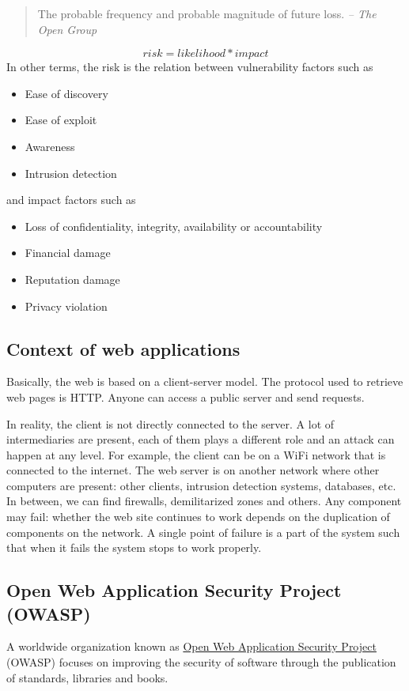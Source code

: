\begin{quote}
The probable frequency and probable magnitude of future loss.
\textit{-- The Open Group}
\end{quote}
\[
   risk = likelihood * impact
\]
In other terms, the risk is the relation between vulnerability factors such as
\begin{itemize}
\item Ease of discovery
\item Ease of exploit
\item Awareness
\item Intrusion detection
\end{itemize}
and impact factors such as
\begin{itemize}
\item Loss of confidentiality, integrity, availability or accountability
\item Financial damage
\item Reputation damage
\item Privacy violation
\end{itemize}

\subsection{Context of web applications}

Basically, the web is based on a client-server model. The protocol used to
retrieve web pages is HTTP. Anyone can access a public server and send
requests.

In reality, the client is not directly connected to the server. A lot of
intermediaries are present, each of them plays a different role and an attack
can happen at any level.
For example, the client can be on a WiFi network that is connected to the
internet. The web server is on another network where other computers are
present: other clients, intrusion detection systems, databases, etc. In
between, we can find firewalls, demilitarized zones and others.
Any component may fail: whether the web site continues to work depends on the
duplication of components on the network. A single point of failure is a part
of the system such that when it fails the system stops to work properly.

\subsection{Open Web Application Security Project (OWASP)}

A worldwide organization known as \href{https://www.owasp.org/}{Open Web
Application Security Project} (OWASP) focuses on improving the security of
software through the publication of standards, libraries and books.

